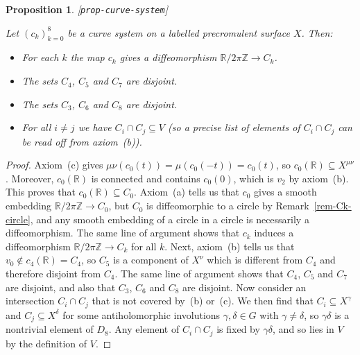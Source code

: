 \documentclass[reqno]{amsart}
\newcommand{\lbl}[1]{\label{#1}\textup{[\texttt{#1}]}\par}
\newcommand{\lbl}{\label}
\newcommand{\gm}        {\gamma}
\newcommand{\dl}        {\delta}
\newcommand{\Z}         {{\mathbb{Z}}}
\newcommand{\R}         {{\mathbb{R}}}
\newcommand{\sse}       {\subseteq}
\renewcommand{\:}{\colon}
\newtheorem{proposition}[theorem]{Proposition}
\theoremstyle{definition}
\begin{document}
\begin{proposition}\lbl{prop-curve-system}
 Let $(c_k)_{k=0}^8$ be a curve system on a labelled precromulent
 surface $X$.  Then:
 \begin{itemize}
  \item[(1)] For each $k$ the map $c_k$ gives a diffeomorphism
   $\R/2\pi\Z\to C_k$.
  \item[(2)] The sets $C_4$, $C_5$ and $C_7$ are disjoint.
  \item[(3)] The sets $C_3$, $C_6$ and $C_8$ are disjoint.
  \item[(4)] For all $i\neq j$ we have $C_i\cap C_j\sse V$ (so a
   precise list of elements of $C_i\cap C_j$ can be read off from
   axiom~(b)).
 \end{itemize}
\end{proposition}
\begin{proof}
 Axiom~(c) gives $\mu\nu(c_0(t))=\mu(c_0(-t))=c_0(t)$, so
 $c_0(\R)\sse X^{\mu\nu}$.  Moreover, $c_0(\R)$ is connected and
 contains $c_0(0)$, which is $v_2$ by axiom~(b).  This proves that
 $c_0(\R)\sse C_0$.  Axiom~(a) tells us that $c_0$ gives a smooth
 embedding $\R/2\pi\Z\to C_0$, but $C_0$ is diffeomorphic to a circle
 by Remark~\ref{rem-Ck-circle}, and any smooth embedding of a circle
 in a circle is necessarily a diffeomorphism.  The same line of
 argument shows that $c_k$ induces a diffeomorphism $\R/2\pi\Z\to C_k$
 for all $k$.  Next, axiom~(b) tells us that $v_0\not\in c_4(\R)=C_4$,
 so $C_5$ is a component of $X^\nu$ which is different from $C_4$ and
 therefore disjoint from $C_4$.  The same line of argument shows that
 $C_4$, $C_5$ and $C_7$ are disjoint, and also that $C_3$, $C_6$ and
 $C_8$ are disjoint.  Now consider an intersection $C_i\cap C_j$ that
 is not covered by~(b) or~(c).  We then find that $C_i\sse X^\gm$ and
 $C_j\sse X^\dl$ for some antiholomorphic involutions $\gm,\dl\in G$
 with $\gm\neq\dl$, so $\gm\dl$ is a nontrivial element of $D_8$.  Any
 element of $C_i\cap C_j$ is fixed by $\gm\dl$, and so lies in $V$ by
 the definition of $V$.
\end{proof}
\end{document}
